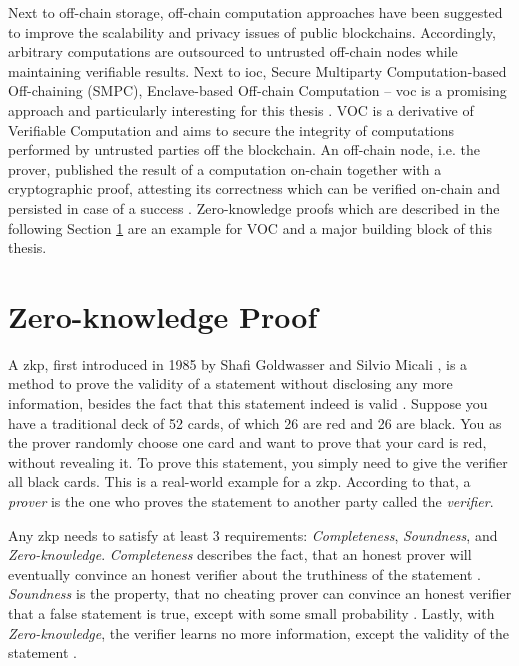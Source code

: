 Next to off-chain storage, off-chain computation approaches have been suggested to improve the scalability and privacy issues of public blockchains. Accordingly, arbitrary computations are outsourced to untrusted off-chain nodes while maintaining verifiable results. Next to \acrfull{ioc}, Secure Multiparty Computation-based Off-chaining (SMPC), Enclave-based Off-chain Computation -- \acrfull{voc} is a promising approach and particularly interesting for this thesis \cite{eberhardtOffchainingModelsApproaches2018}. VOC is a derivative of Verifiable Computation and aims to secure the integrity of computations performed by untrusted parties off the blockchain. An off-chain node, i.e. the prover, published the result of a computation on-chain together with a cryptographic proof, attesting its correctness which can be verified on-chain and persisted in case of a success \cite{eberhardtOffchainingModelsApproaches2018,eberhardtZoKratesScalablePrivacyPreserving2018a,simunicVerifiableComputingApplications2021,xuSlimChainScalingBlockchain}. Zero-knowledge proofs which are described in the following Section \ref{sec:zkp} are an example for VOC and a major building block of this thesis.

\section{Zero-knowledge Proof}
\label{sec:zkp}

A \acrfull{zkp}, first introduced in 1985 by Shafi Goldwasser and Silvio Micali \cite{doi:10.1137/0218012}, is a method to prove the validity of a statement without disclosing any more information, besides the fact that this statement indeed is valid \cite{simunicVerifiableComputingApplications2021}. Suppose you have a traditional deck of 52 cards, of which 26 are red and 26 are black. You as the prover randomly choose one card and want to prove that your card is red, without revealing it. To prove this statement, you simply need to give the verifier all black cards. This is a real-world example for a \acrshort{zkp}. According to that, a \emph{prover} is the one who proves the statement to another party called the \emph{verifier}.

Any \acrshort{zkp} needs to satisfy at least 3 requirements: \emph{Completeness}, \emph{Soundness}, and \emph{Zero-knowledge}. \emph{Completeness} describes the fact, that an honest prover will eventually convince an honest verifier about the truthiness of the statement \cite{simunicVerifiableComputingApplications2021}. \emph{Soundness} is the property, that no cheating prover can convince an honest verifier that a false statement is true, except with some small probability \cite{simunicVerifiableComputingApplications2021}. Lastly, with \emph{Zero-knowledge}, the verifier learns no more information, except the validity of the statement \cite{simunicVerifiableComputingApplications2021}.

